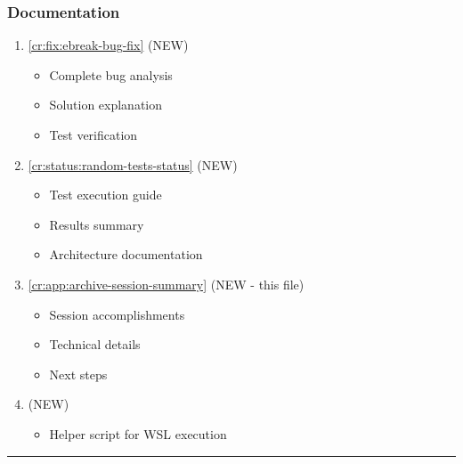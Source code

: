 \subsubsection{Documentation}\label{cr:app:archive-session-summary:documentation}

\begin{record}

\begin{enumerate}
\def\labelenumi{\arabic{enumi}.}
\setcounter{enumi}{4}
\item
  \cref{cr:fix:ebreak-bug-fix} (NEW)

  \begin{itemize}
  \tightlist
  \item
    Complete bug analysis
  \item
    Solution explanation
  \item
    Test verification
  \end{itemize}
\item
  \cref{cr:status:random-tests-status} (NEW)

  \begin{itemize}
  \tightlist
  \item
    Test execution guide
  \item
    Results summary
  \item
    Architecture documentation
  \end{itemize}
\item
  \cref{cr:app:archive-session-summary} (NEW - this file)

  \begin{itemize}
  \tightlist
  \item
    Session accomplishments
  \item
    Technical details
  \item
    Next steps
  \end{itemize}
\item
   (NEW)

  \begin{itemize}
  \tightlist
  \item
    Helper script for WSL execution
  \end{itemize}
\end{enumerate}

\begin{center}\rule{0.5\linewidth}{0.5pt}\end{center}

\end{record}

